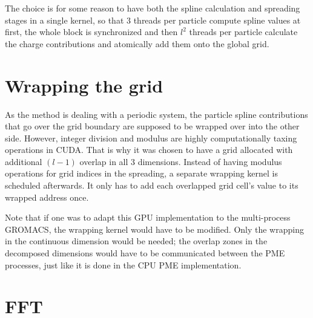 \documentclass[12pt,a4paper]{report}
\newcommand{\draft}[1]{#1}
\begin{document}
The choice is for some reason to have both the spline calculation and spreading stages in a single kernel, so that 3 threads per particle compute spline values at first, the whole block is synchronized and then $l^2$ threads per particle calculate the charge contributions and atomically add them onto the global grid. 


\section{Wrapping the grid}
As the method is dealing with a periodic system, the particle spline contributions that go over the grid boundary are supposed to be wrapped over into the other side.
However, integer division and modulus are highly computationally taxing operations in CUDA. 
That is why it was chosen to have a grid allocated with additional $(l-1)$ overlap in all 3 dimensions. Instead of having modulus operations for grid indices in the spreading, 
a separate wrapping kernel is scheduled afterwards. It only has to add each overlapped grid cell's value to its wrapped address once. 


Note that if one was to adapt this GPU implementation to the multi-process GROMACS, the wrapping kernel would have to be modified. Only the wrapping in the continuous dimension  would be needed; the overlap zones in the decomposed dimensions would have to be communicated between the PME processes, just like it is done in the CPU PME implementation. 

\section{FFT}
\end{document}
